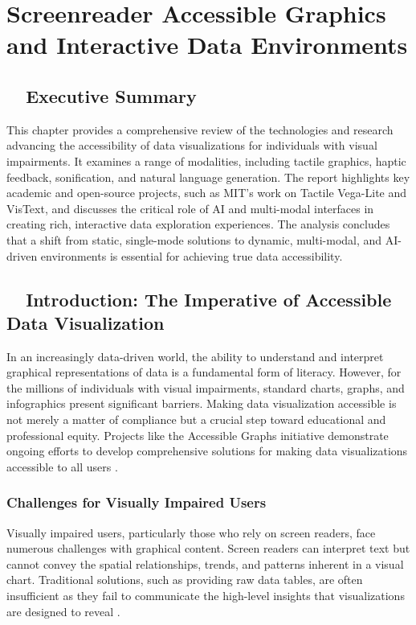 \chapter{Screenreader Accessible Graphics and Interactive Data Environments}\label{ch13:accessible-graphics}
\raggedright

\section{~~Executive Summary}\label{ch13:sec:executive-summary}
This chapter provides a comprehensive review of the technologies and research advancing the accessibility of data visualizations for individuals with visual impairments. It examines a range of modalities, including tactile graphics, haptic feedback, sonification, and natural language generation. The report highlights key academic and open-source projects, such as MIT's work on Tactile Vega-Lite and VisText, and discusses the critical role of AI and multi-modal interfaces in creating rich, interactive data exploration experiences. The analysis concludes that a shift from static, single-mode solutions to dynamic, multi-modal, and AI-driven environments is essential for achieving true data accessibility.

\section{~~Introduction: The Imperative of Accessible Data Visualization}\label{ch13:sec:introduction}
In an increasingly data-driven world, the ability to understand and interpret graphical representations of data is a fundamental form of literacy. However, for the millions of individuals with visual impairments, standard charts, graphs, and infographics present significant barriers. Making data visualization accessible is not merely a matter of compliance but a crucial step toward educational and professional equity. Projects like the Accessible Graphs initiative demonstrate ongoing efforts to develop comprehensive solutions for making data visualizations accessible to all users \supercite{AccessibleGraphs, AccessVizWorkshop}.

\subsection{Challenges for Visually Impaired Users}\label{ch13:ssec:challenges}
Visually impaired users, particularly those who rely on screen readers, face numerous challenges with graphical content. Screen readers can interpret text but cannot convey the spatial relationships, trends, and patterns inherent in a visual chart. Traditional solutions, such as providing raw data tables, are often insufficient as they fail to communicate the high-level insights that visualizations are designed to reveal \supercite{Lundgard2021, Zewe2021Making}.

